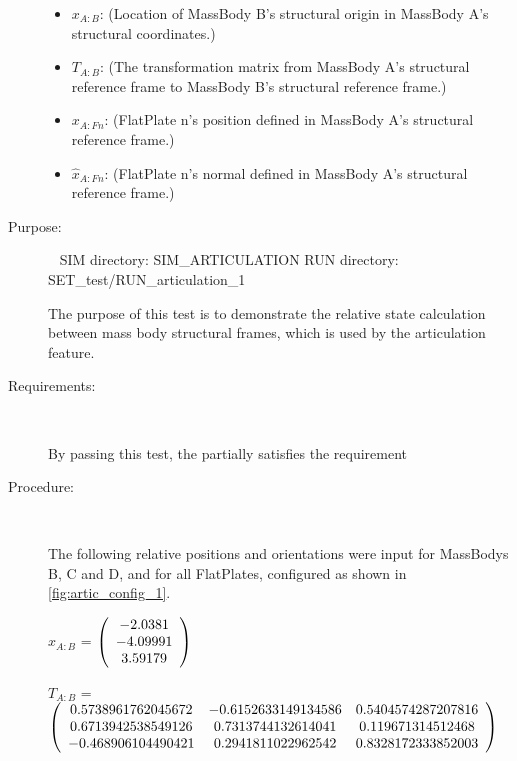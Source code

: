 \begin{description}
\begin{itemize}
\item{$x_{A:B}$}: (Location of MassBody B's
structural origin in MassBody A's structural coordinates.)
\item{$T_{A:B}$}: (The transformation matrix from MassBody
A's structural reference frame to MassBody B's structural reference frame.)
\item{$x_{A:Fn}$}: (FlatPlate n's position defined in MassBody A's structural
reference frame.)
\item{$\hat{x}_{A:Fn}$}: (FlatPlate n's normal defined in MassBody A's structural
reference frame.)
\end{itemize}

\item[Purpose:] \ \newline
SIM directory: SIM\_ARTICULATION
RUN directory: SET\_test/RUN\_articulation\_1

The purpose of this test is to demonstrate the relative state calculation
between mass body structural frames, which is used by the articulation
feature.

\item[Requirements:] \ \newline

By passing this test, the \ModelDesc partially satisfies
the requirement 

\item[Procedure:] \ \newline

The following relative positions and orientations were input for MassBodys
B, C and D, and for all FlatPlates, configured as shown in
\ref{fig:artic_config_1}.

$x_{A:B}$ = $\left( \begin{array} {ccc}    -2.0381 \\   -4.09991 \\    3.59179
\end{array} \right)\\ \\$

$T_{A:B}$ = $\left( \begin{array} {ccc}
   0.5738961762045672 & -0.6152633149134586 & 0.5404574287207816 \\
   0.6713942538549126 & 0.7313744132614041 & 0.119671314512468 \\
   -0.468906104490421 & 0.2941811022962542 & 0.8328172333852003 \\
\end{array} \right)\\ \\$


\end{description}
